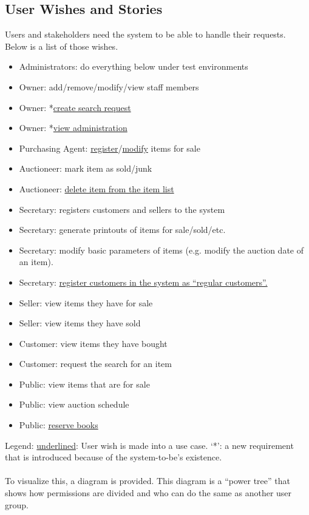 \subsection{User Wishes and Stories}
Users and stakeholders need the system to be able to handle their requests. Below is a list of those wishes.
\begin{itemize}[noitemsep]
	\item Administrators: do everything below under test environments
	\item Owner: add/remove/modify/view staff members
	\item Owner: *\underline{create search request}
	\item Owner: *\underline{view administration}
	\item Purchasing Agent: \underline{register}/\underline{modify} items for sale
	\item Auctioneer: mark item as sold/junk
	\item Auctioneer: \underline{delete item from the item list}
	\item Secretary: registers customers and sellers to the system
	\item Secretary: generate printouts of items for sale/sold/etc.
	\item Secretary: modify basic parameters of items (e.g. modify the auction date of an item).
	\item Secretary: \underline{register customers in the system as ``regular customers''.}
	\item Seller: view items they have for sale
	\item Seller: view items they have sold
	\item Customer: view items they have bought
	\item Customer: request the search for an item
	\item Public: view items that are for sale
	\item Public: view auction schedule
	\item Public: \underline{reserve books}
\end{itemize}
Legend: \underline{underlined}: User wish is made into a use case. `*': a new requirement that is introduced because of the system-to-be's existence.\\\\
To visualize this, a diagram is provided. This diagram is a ``power tree'' that shows how permissions are divided and who can do the same as another user group.
